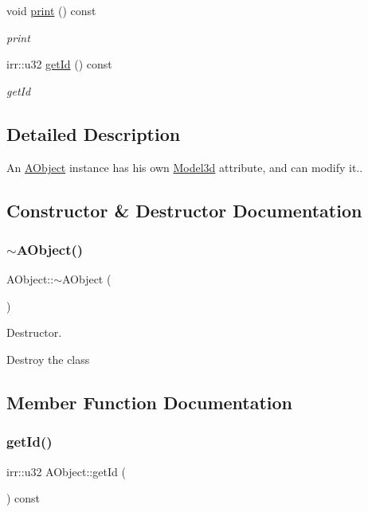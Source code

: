 \begin{DoxyCompactItemize}
void \hyperlink{classAObject_aebbd61ad13e23fa7787a5cdf12acd4ca}{print} () const
\begin{DoxyCompactList}\small\item\em print \end{DoxyCompactList}\item 
irr\+::u32 \hyperlink{classAObject_aae823d79b9bfa1ef090ee9e7b764de4a}{get\+Id} () const
\begin{DoxyCompactList}\small\item\em get\+Id \end{DoxyCompactList}\end{DoxyCompactItemize}


\subsection{Detailed Description}
An \hyperlink{classAObject}{A\+Object} instance has his own \hyperlink{classModel3d}{Model3d} attribute, and can modify it.. 

\subsection{Constructor \& Destructor Documentation}
\mbox{\label{classAObject_ac17f3a1944792c280a3cbd83d839bc4e}} 
\subsubsection{\texorpdfstring{$\sim$\+A\+Object()}{~AObject()}}
{\footnotesize\ttfamily A\+Object\+::$\sim$\+A\+Object (\begin{DoxyParamCaption}{ }\end{DoxyParamCaption})}



Destructor. 

Destroy the class 

\subsection{Member Function Documentation}
\mbox{\label{classAObject_aae823d79b9bfa1ef090ee9e7b764de4a}} 
\subsubsection{\texorpdfstring{get\+Id()}{getId()}}
{\footnotesize\ttfamily irr\+::u32 A\+Object\+::get\+Id (\begin{DoxyParamCaption}{ }\end{DoxyParamCaption}) const}



